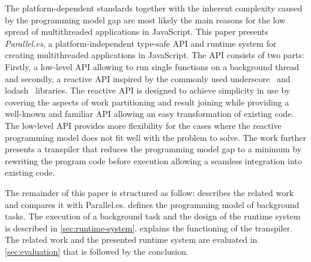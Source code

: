 The platform-dependent standards together with the inherent complexity caused by the programming model gap are most likely the main reasons for the low spread of multithreaded applications in JavaScript. This paper presents \textit{Parallel.es}, a platform-independent type-safe API and runtime system for creating multithreaded applications in JavaScript. The API consists of two parts: Firstly, a low-level API allowing to run single functions on a background thread and secondly, a reactive API inspired by the commonly used underscore~\cite{underscorejs} and lodash~\cite{lodash} libraries. The reactive API is designed to achieve simplicity in use by covering the aspects of work partitioning and result joining while providing a well-known and familiar API allowing an easy transformation of existing code. The low-level API provides more flexibility for the cases where the reactive programming model does not fit well with the problem to solve. The work further presents a transpiler that reduces the programming model gap to a minimum by rewriting the program code before execution allowing a seamless integration into existing code.  

The remainder of this paper is structured as follow:  describes the related work and compares it with Parallel.es.  defines the programming model of background tasks. The execution of a background task and the design of the runtime system is described in \cref{sec:runtime-system}.  explains the functioning of the transpiler. The related work and the presented runtime system are evaluated in \cref{sec:evaluation} that is followed by the conclusion. 